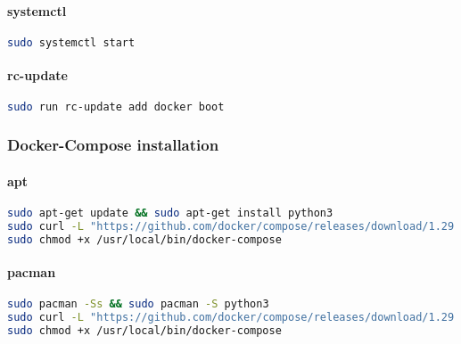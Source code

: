 \paragraph{systemctl}

\begin{flushleft}
\begin{lstlisting}[language=bash,label={lst:systemctl-docker}]
sudo systemctl start\end{lstlisting}
\end{flushleft}

\paragraph{rc-update}
\begin{flushleft}
\begin{lstlisting}[language=bash,label={lst:rc-docker}]
sudo run rc-update add docker boot\end{lstlisting}
\end{flushleft}

\subsubsection{Docker-Compose installation}
\paragraph{apt}
\begin{flushleft}
\begin{lstlisting}[language=bash,label={lst:apt-compose}]
sudo apt-get update && sudo apt-get install python3
sudo curl -L "https://github.com/docker/compose/releases/download/1.29.2/docker-compose-$(uname -s)-$(uname -m)" -o /usr/local/bin/docker-compose
sudo chmod +x /usr/local/bin/docker-compose\end{lstlisting}
\end{flushleft}

\paragraph{pacman}
\begin{flushleft}
\begin{lstlisting}[language=bash,label={lst:pacman-compose}]
sudo pacman -Ss && sudo pacman -S python3
sudo curl -L "https://github.com/docker/compose/releases/download/1.29.2/docker-compose-$(uname -s)-$(uname -m)" -o /usr/local/bin/docker-compose
sudo chmod +x /usr/local/bin/docker-compose\end{lstlisting}
\end{flushleft}

